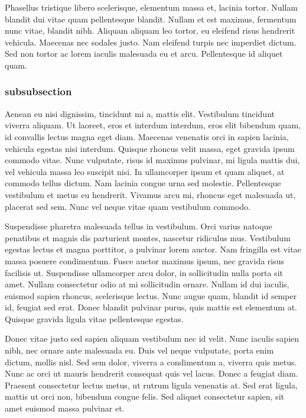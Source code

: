 \documentclass[9pt, letterpaper, twocolumn]{article}
\begin{document}
Phasellus tristique libero scelerisque, elementum massa et, lacinia tortor. Nullam blandit dui vitae quam pellentesque blandit. Nullam et est maximus, fermentum nunc vitae, blandit nibh. Aliquam aliquam leo tortor, eu eleifend risus hendrerit vehicula. Maecenas nec sodales justo. Nam eleifend turpis nec imperdiet dictum. Sed non tortor ac lorem iaculis malesuada eu et arcu. Pellentesque id aliquet quam.
\subsubsection{subsubsection}
Aenean eu nisi dignissim, tincidunt mi a, mattis elit. Vestibulum tincidunt viverra aliquam. Ut laoreet, eros et interdum interdum, eros elit bibendum quam, id convallis lectus magna eget diam. Maecenas venenatis orci in sapien lacinia, vehicula egestas nisi interdum. Quisque rhoncus velit massa, eget gravida ipsum commodo vitae. Nunc vulputate, risus id maximus pulvinar, mi ligula mattis dui, vel vehicula massa leo suscipit nisi. In ullamcorper ipsum et quam aliquet, at commodo tellus dictum. Nam lacinia congue urna sed molestie. Pellentesque vestibulum et metus eu hendrerit. Vivamus arcu mi, rhoncus eget malesuada ut, placerat sed sem. Nunc vel neque vitae quam vestibulum commodo.

Suspendisse pharetra malesuada tellus in vestibulum. Orci varius natoque penatibus et magnis dis parturient montes, nascetur ridiculus mus. Vestibulum egestas lectus et magna porttitor, a pulvinar lorem auctor. Nam fringilla est vitae massa posuere condimentum. Fusce auctor maximus ipsum, nec gravida risus facilisis ut. Suspendisse ullamcorper arcu dolor, in sollicitudin nulla porta sit amet. Nullam consectetur odio at mi sollicitudin ornare. Nullam id dui iaculis, euismod sapien rhoncus, scelerisque lectus. Nunc augue quam, blandit id semper id, feugiat sed erat. Donec blandit pulvinar purus, quis mattis est elementum at. Quisque gravida ligula vitae pellentesque egestas.

Donec vitae justo sed sapien aliquam vestibulum nec id velit. Nunc iaculis sapien nibh, nec ornare ante malesuada eu. Duis vel neque vulputate, porta enim dictum, mollis nisl. Sed sem dolor, viverra a condimentum a, viverra quis metus. Nunc ac orci ut mauris hendrerit consequat quis vel lacus. Donec a feugiat diam. Praesent consectetur lectus metus, ut rutrum ligula venenatis at. Sed erat ligula, mattis ut orci non, bibendum congue felis. Sed aliquet consectetur sapien, sit amet euismod massa pulvinar et.
\end{document}
